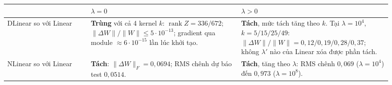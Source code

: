 \begin{tabular}{@{}p{0.2\linewidth}p{0.36\linewidth}p{0.36\linewidth}@{}}
\toprule
 & $\lambda = 0$ & $\lambda > 0$ \\
\midrule
DLinear so với Linear & \textbf{Trùng} với cả 4 kernel $k$: $\operatorname{rank} Z = 336/672$; $\|\Delta W\|/\|W\| \le 5\cdot 10^{-13}$; gradient qua module $\approx 6\cdot 10^{-15}$ lần lúc khởi tạo. & \textbf{Tách}, mức tách tăng theo $k$. Tại $\lambda = 10^4$, $k = 5/15/25/49$: $\|\Delta W\|/\|W\| = 0{,}12/0{,}19/0{,}28/0{,}37$; không $\lambda'$ nào của Linear xóa được phần tách. \\
\addlinespace
NLinear so với Linear & \textbf{Tách}: $\|\Delta W\|_F = 0{,}0694$; RMS chênh dự báo test $0{,}0514$. & \textbf{Tách}, tăng theo $\lambda$: RMS chênh $0{,}069$ ($\lambda = 10^4$) đến $0{,}973$ ($\lambda = 10^8$). \\
\bottomrule
\end{tabular}
